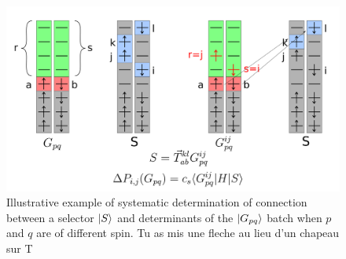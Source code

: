 \documentclass[./thesis.tex]{subfiles}
\begin{document}
\begin{figure}[h!]
	\begin{center}
		\includegraphics[width=0.90\columnwidth]{figures/cipsi/systematic_determination2}	
		\caption{Illustrative example of systematic determination of connection between a selector $\ket S$ and determinants of the $\ket {G_{pq}}$ batch when $p$ and $q$ are of different spin.
\alert{ Tu as mis une fleche au lieu d'un chapeau sur T}
}
		\label{fig:systematic_determination2}
	\end{center}
\end{figure}
\end{document}
